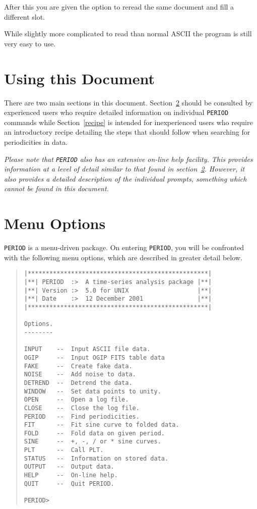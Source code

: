 After this you are given the option to reread the same document and fill a 
different slot.

While slightly more complicated to read than normal ASCII the 
program is still very easy to use.

\section{Using this Document}

There are two main sections in this document.  Section~\ref{menu}
should be consulted by experienced users who require detailed
information on individual {\tt PERIOD} commands while
Section~\ref{recipe} is intended for inexperienced users who require an
introductory recipe detailing the steps that should follow when
searching for periodicities in data.

{\em Please note that {\tt PERIOD} also has an extensive on-line help
facility.  This provides information at a level of detail similar to
that found in section~\ref{menu}. However, it also provides a detailed
description of the individual prompts, something which cannot be found
in this document.}

\section{Menu Options}
\label{menu}

{\tt PERIOD} is a menu-driven package. On entering {\tt PERIOD}, you will be
confronted with the following menu options, which are described in greater
detail below.

\begin{quote}
\begin{verbatim}
|**************************************************|
|**| PERIOD  :>  A time-series analysis package |**|
|**| Version :>  5.0 for UNIX                   |**|
|**| Date    :>  12 December 2001               |**|
|**************************************************|
 
Options.
--------

INPUT    --  Input ASCII file data.
OGIP     --  Input OGIP FITS table data 
FAKE     --  Create fake data.
NOISE    --  Add noise to data.
DETREND  --  Detrend the data.
WINDOW   --  Set data points to unity.
OPEN     --  Open a log file.
CLOSE    --  Close the log file.
PERIOD   --  Find periodicities.
FIT      --  Fit sine curve to folded data.
FOLD     --  Fold data on given period.
SINE     --  +, -, / or * sine curves.
PLT      --  Call PLT.
STATUS   --  Information on stored data.
OUTPUT   --  Output data.
HELP     --  On-line help.
QUIT     --  Quit PERIOD.

PERIOD> 
\end{verbatim}
\end{quote}

